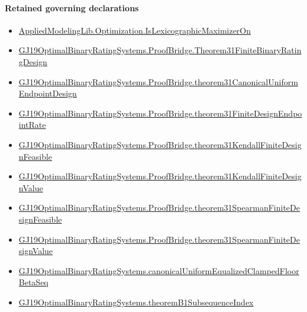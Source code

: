 \documentclass[10pt]{article}
\begin{document}
\paragraph{Retained governing declarations}
\begin{itemize}\raggedright
\item \hyperlink{governing-declaration-508c4e6a797747f7}{Applied\allowbreak{}Modeling\allowbreak{}Lib.\allowbreak{}Optimization.\allowbreak{}Is\allowbreak{}Lexicographic\allowbreak{}Maximizer\allowbreak{}On}
\item \hyperlink{governing-declaration-ef54433415149645}{GJ19\allowbreak{}Optimal\allowbreak{}Binary\allowbreak{}Rating\allowbreak{}Systems.\allowbreak{}Proof\allowbreak{}Bridge.\allowbreak{}Theorem31\allowbreak{}Finite\allowbreak{}Binary\allowbreak{}Rating\allowbreak{}Design}
\item \hyperlink{governing-declaration-e13384af99ccaeb3}{GJ19\allowbreak{}Optimal\allowbreak{}Binary\allowbreak{}Rating\allowbreak{}Systems.\allowbreak{}Proof\allowbreak{}Bridge.\allowbreak{}theorem31\allowbreak{}Canonical\allowbreak{}Uniform\allowbreak{}Endpoint\allowbreak{}Design}
\item \hyperlink{governing-declaration-db99658ce2986512}{GJ19\allowbreak{}Optimal\allowbreak{}Binary\allowbreak{}Rating\allowbreak{}Systems.\allowbreak{}Proof\allowbreak{}Bridge.\allowbreak{}theorem31\allowbreak{}Finite\allowbreak{}Design\allowbreak{}Endpoint\allowbreak{}Rate}
\item \hyperlink{governing-declaration-9d53ce551ff8ce63}{GJ19\allowbreak{}Optimal\allowbreak{}Binary\allowbreak{}Rating\allowbreak{}Systems.\allowbreak{}Proof\allowbreak{}Bridge.\allowbreak{}theorem31\allowbreak{}Kendall\allowbreak{}Finite\allowbreak{}Design\allowbreak{}Feasible}
\item \hyperlink{governing-declaration-94f35330a22a6c8e}{GJ19\allowbreak{}Optimal\allowbreak{}Binary\allowbreak{}Rating\allowbreak{}Systems.\allowbreak{}Proof\allowbreak{}Bridge.\allowbreak{}theorem31\allowbreak{}Kendall\allowbreak{}Finite\allowbreak{}Design\allowbreak{}Value}
\item \hyperlink{governing-declaration-feacb658af0b846f}{GJ19\allowbreak{}Optimal\allowbreak{}Binary\allowbreak{}Rating\allowbreak{}Systems.\allowbreak{}Proof\allowbreak{}Bridge.\allowbreak{}theorem31\allowbreak{}Spearman\allowbreak{}Finite\allowbreak{}Design\allowbreak{}Feasible}
\item \hyperlink{governing-declaration-d913e6cbd10cc81f}{GJ19\allowbreak{}Optimal\allowbreak{}Binary\allowbreak{}Rating\allowbreak{}Systems.\allowbreak{}Proof\allowbreak{}Bridge.\allowbreak{}theorem31\allowbreak{}Spearman\allowbreak{}Finite\allowbreak{}Design\allowbreak{}Value}
\item \hyperlink{governing-declaration-c5a1630853f1a2fa}{GJ19\allowbreak{}Optimal\allowbreak{}Binary\allowbreak{}Rating\allowbreak{}Systems.\allowbreak{}canonical\allowbreak{}Uniform\allowbreak{}Equalized\allowbreak{}Clamped\allowbreak{}Floor\allowbreak{}Beta\allowbreak{}Seq}
\item \hyperlink{governing-declaration-953d953c96126c35}{GJ19\allowbreak{}Optimal\allowbreak{}Binary\allowbreak{}Rating\allowbreak{}Systems.\allowbreak{}theorem\allowbreak{}B1\allowbreak{}Subsequence\allowbreak{}Index}
\end{itemize}
\end{document}
